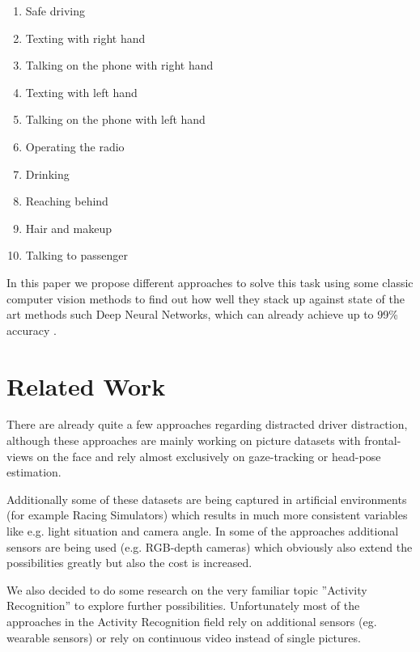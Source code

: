\documentclass[10pt,twocolumn,letterpaper]{article}
\begin{document}
\begin{enumerate}
	\item Safe driving
	\item Texting with right hand
	\item Talking on the phone with right hand
	\item Texting with left hand
	\item Talking on the phone with left hand
	\item Operating the radio
	\item Drinking
	\item Reaching behind
	\item Hair and makeup
	\item Talking to passenger
\end{enumerate}

In this paper we propose different approaches to solve this task using some classic computer vision methods to find out how well they stack up against state of the art methods such Deep Neural Networks, which can already achieve up to 99\% accuracy .



\section{Related Work}

There are already quite a few approaches regarding distracted driver distraction, although these approaches are mainly working on picture datasets with frontal-views on the face and rely almost exclusively on gaze-tracking or head-pose estimation. \cite{Dorazio} \cite{6957817}

Additionally some of these datasets are being captured in artificial environments (for example Racing Simulators) \cite{itsc:bergasa2008} which results in much more consistent variables like e.g. light situation and camera angle. In some of the approaches additional sensors are being used (e.g. RGB-depth cameras) which obviously also extend the possibilities greatly but also the cost is increased. \cite{Ragab2014}

We also decided to do some research on the very familiar topic ''Activity Recognition'' to explore further possibilities. Unfortunately most of the approaches in the Activity Recognition field rely on additional sensors (eg. wearable sensors) \cite{6258525} \cite{6365160} or rely on continuous video instead of single pictures. \cite{1315249} \cite{1430826}
\end{document}
